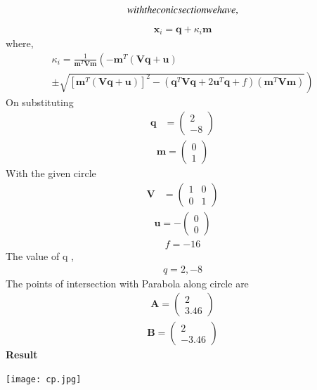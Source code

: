 \documentclass[10pt,a4paper]{report}
\newcommand{\myvec}[1]{\ensuremath{\begin{pmatrix}#1\end{pmatrix}}}
\let\vec\mathbf
\let\vec\mathbf
\providecommand{\brak}[1]{\ensuremath{\left(#1\right)}}
\providecommand{\lbrak}[1]{\ensuremath{\left(#1\right.}}
\providecommand{\rbrak}[1]{\ensuremath{\left.#1\right)}}
\providecommand{\sbrak}[1]{\ensuremath{{}\left[#1\right]}}
\begin{document}
\begin{multicols}{2}
\begin{align}
\noindent with the conic section  we have ,
\end{align}
\begin{align}
\vec{x}_i = \vec{q} + \kappa_i \vec{m}
\end{align}
where, \\
{\tiny
\begin{multline}
\kappa_i = \frac{1}
{
\vec{m}^T\vec{V}\vec{m}
}
\lbrak{-\vec{m}^T\brak{\vec{V}\vec{q}+\vec{u}}}
\\
\pm
\rbrak{\sqrt{
\sbrak{
\vec{m}^T\brak{\vec{V}\vec{q}+\vec{u}}
}^2
-
\brak
{
\vec{q}^T\vec{V}\vec{q} + 2\vec{u}^T\vec{q} +f
}
\brak{\vec{m}^T\vec{V}\vec{m}}
}
}
\end{multline}
}
On substituting\\
\begin{align}
\vec{q} &= \myvec{
2\\
-8
} 
\end{align}
\begin{align}
\vec{m} = \myvec{0 \\ 1}
\end{align}
With the given circle\\ 
\begin{align}
	\vec{V} &= \myvec{
1 & 0\\
0 & 1
    }
\end{align}
\begin{align}
	\vec{u} = -\myvec{0 \\0}
 \end{align}
 \begin{align}
  f = -16
 \end{align}
The value of q ,\\
\begin{align}
    q = 2,-8
\end{align}
The points of intersection with Parabola along circle are \\
\begin{align}
    \vec{A}=\myvec{
2\\
3.46
    }
\end{align}
\begin{align}
    \vec{B}=\myvec{
2\\
-3.46
    }
\end{align}
\textbf{Result}
\begin{center}
\begin{minipage}[b]{0.4\textwidth}
    \texttt{[image: cp.jpg]}
  \end{minipage}
\end{center}\vspace{1mm}

\end{multicols}
\end{document}
